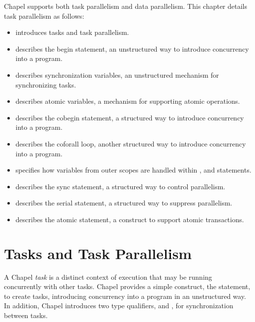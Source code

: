 \label{Task_Parallelism_and_Synchronization}

Chapel supports both task parallelism and data parallelism.  This
chapter details task parallelism as follows:
\begin{itemize}
\item {} introduces tasks and task parallelism.
\item {} describes the begin statement, an unstructured way
to introduce concurrency into a program.
\item {} describes synchronization
variables, an unstructured mechanism for synchronizing tasks.
\item {} describes atomic variables, a mechanism
for supporting atomic operations. 
\item {} describes the cobegin statement, a structured way to
introduce concurrency into a program.
\item {} describes the coforall loop, another structured way to
introduce concurrency into a program.
\item {} specifies how variables from outer scopes
are handled within ,  and 
statements.
\item {} describes the sync statement, a structured
way to control parallelism.
\item {} describes the serial statement, a structured way to suppress
parallelism.
\item {} describes the atomic statement, a construct to
support atomic transactions.
\end{itemize}

\section{Tasks and Task Parallelism}
\label{Task_parallelism}

A Chapel \emph{task} is a distinct context of execution that may be
running concurrently with other tasks.  Chapel provides a simple
construct, the  statement, to create tasks, introducing
concurrency into a program in an unstructured way.  In addition,
Chapel introduces two type qualifiers,  and ,
for synchronization between tasks.


